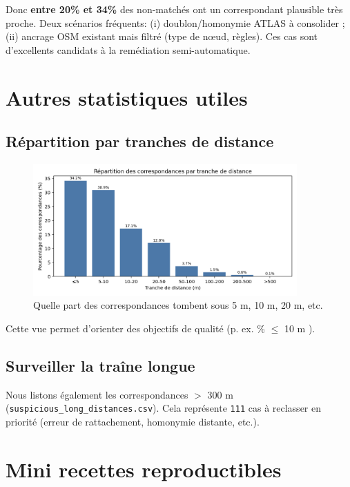 Donc \textbf{entre 20\% et 34\%} des non-matchés ont un correspondant plausible très proche. Deux scénarios fréquents: (i) doublon/homonymie ATLAS à consolider ; (ii) ancrage OSM 
existant mais filtré (type de nœud, règles). Ces cas sont d'excellents candidats à la remédiation semi-automatique.

\section{Autres statistiques utiles}

\subsection*{Répartition par tranches de distance}

\begin{figure}[H]
    \centering
    \includegraphics[width=0.9\textwidth]{../figures/chap5/distance_coverage_buckets.png}
    \caption[Tranches de distance]{Quelle part des correspondances tombent sous 5 m, 10 m, 20 m, etc.}
\end{figure}

Cette vue permet d'orienter des objectifs de qualité (p. ex. \% \(\leq\) 10 m \fg{}).

\subsection*{Surveiller la traîne longue}

Nous listons également les correspondances \(>\) 300 m (\texttt{suspicious\_long\_distances.csv}). 
Cela représente \texttt{111} cas à reclasser en priorité (erreur de rattachement, homonymie distante, etc.).

\section{Mini recettes reproductibles}


